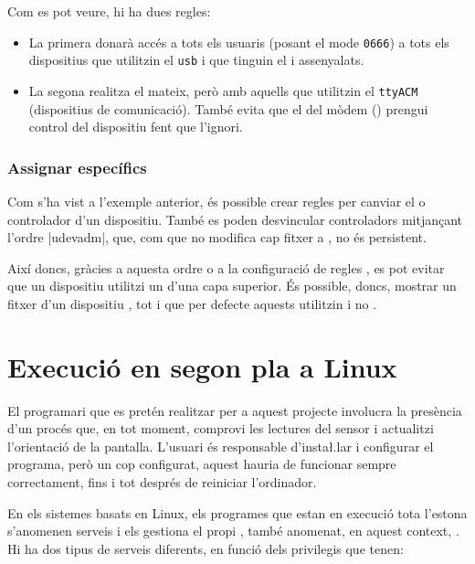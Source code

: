 Com es pot veure, hi ha dues regles:
\begin{itemize}
    \item La primera donarà accés a tots els usuaris (posant el mode
    \texttt{0666}) a tots els dispositius que utilitzin el 
    \texttt{usb} i que tinguin el  i  assenyalats.
    \item La segona realitza el mateix, però amb aquells que utilitzin el
     \texttt{ttyACM} (dispositius de comunicació). També evita que
    el  del mòdem () prengui control del
    dispositiu fent que l'ignori.
\end{itemize}

\subsubsection*{Assignar  específics}

Com s'ha vist a l'exemple anterior, és possible crear regles  per
canviar el  o controlador d'un dispositiu. També es poden desvincular
controladors mitjançant l'ordre \ord|udevadm|, que, com que no modifica cap fitxer
a , no és persistent.

Així doncs, gràcies a aquesta ordre o a la configuració de regles ,
es pot evitar que un dispositiu utilitzi un  d'una capa superior.
És possible, doncs, mostrar un fitxer  d'un dispositiu
 \cite{unbindingHid}, tot i que per defecte aquests utilitzin
 i no .

\section{Execució en segon pla a Linux}
\label{subsec:systemd}

El programari que es pretén realitzar per a aquest projecte involucra la
presència d'un procés que, en tot moment, comprovi les lectures del sensor i
actualitzi l'orientació de la pantalla. L'usuari és responsable d'insta\l.lar i
configurar el programa, però un cop configurat, aquest hauria de funcionar
sempre correctament, fins i tot després de reiniciar l'ordinador.

En els sistemes basats en Linux, els programes que estan en execució tota
l'estona s'anomenen serveis i els gestiona el propi , també anomenat,
en aquest context,  \cite{Systemd}. Hi ha dos tipus de serveis
diferents, en funció dels privilegis que tenen:

